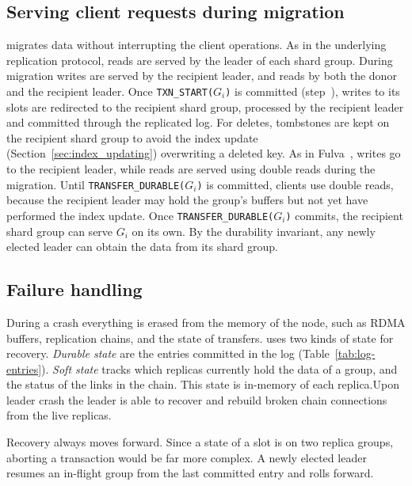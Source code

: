 \subsection{Serving client requests during migration}
\label{sec:serving-during-migration}

\OurImplementation{} migrates data without interrupting the client operations.
As in the underlying replication protocol, reads are served by the leader of each shard group.
During migration writes are served by the recipient leader, and reads by both the donor and the recipient leader.
Once \texttt{TXN\_START($G_i$)} is committed (step~), writes to its slots are redirected to the recipient shard group, processed by the recipient leader and committed through the replicated log.
For deletes, tombstones are kept on the recipient shard group to avoid the index update (Section~\ref{sec:index_updating}) overwriting a deleted key.
As in Fulva~\cite{fulva}, writes go to the recipient leader, while reads are served using double reads during the migration.
Until \texttt{TRANSFER\_DURABLE($G_i$)} is committed, clients use double reads, because the recipient leader may hold the group's buffers but not yet have performed the index update.
Once \texttt{TRANSFER\_DURABLE($G_i$)} commits, the recipient shard group can serve $G_i$ on its own.
By the durability invariant, any newly elected leader can obtain the data from its shard group.

\subsection{Failure handling}
\label{sec:failure-handling}


During a crash everything is erased from the memory of the node, such as RDMA buffers, replication chains, and the state of transfers.
\OurImplementation{} uses two kinds of state for recovery.
\emph{Durable state} are the entries committed in the log (Table~\ref{tab:log-entries}).
\emph{Soft state} tracks which replicas currently hold the data of a group, and the status of the links in the chain.
This state is in-memory of each replica.Upon leader crash the leader is able to recover and rebuild broken chain connections from the live replicas.


Recovery always moves forward. Since a state of a slot is on two replica groups, aborting a transaction would be far more complex. A newly elected leader resumes an in-flight group from the last committed entry and rolls forward.

